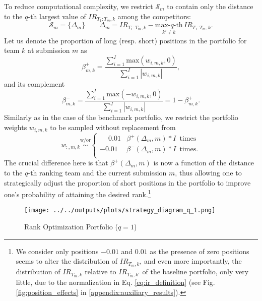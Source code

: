 \documentclass[3p,times,twocolumn]{elsarticle}
\begin{document}
To reduce computational complexity, we restrict $\mathcal{S}_{m}$ to contain only the distance to the $q$-th largest value of $IR_{T_{1}:T_{m},k}$ among the competitors:
\begin{equation}
    \mathcal{S}_m = \lbrace \Delta_{m} \rbrace \qquad \Delta_{m} = IR_{T_1:T_m,k} - \underset{k' \neq k}{\textrm{max-$q$-th}} \,IR_{T_1:T_m,k}.
\end{equation}
Let us denote the proportion of long (resp. short) positions in the portfolio for team $k$ at submission $m$ as
\begin{equation}
    \beta^{+}_{m,k} = \dfrac{\sum_{i=1}^{I}\textrm{max}(w_{i,m,k},0)}{\sum_{i=1}^{I}|w_{i,m,k}|},
\end{equation}
and its complement
\begin{equation}
    \beta^{-}_{m,k} = \dfrac{\sum_{i=1}^{I}\textrm{max}(-w_{i,m,k},0)}{\sum_{i=1}^{I}|w_{i,m,k}|} = 1- \beta^{+}_{m,k}.
\end{equation}
Similarly as in the case of the benchmark portfolio, we restrict the portfolio weights $w_{i,m,k}$ to be sampled without replacement from
\begin{equation}\label{eq:rank_opt_portfolio}
    w_{:,m,k} \overset{\mathrm{w/or}}{\sim} \begin{cases}
        \phantom{+}0.01 & \beta^{+}(\Delta_{m},m)*I\, \text{ times} \\
        -0.01  & \beta^{-}(\Delta_{m},m)*I\, \text{ times}. \\
    \end{cases}
\end{equation}
The crucial difference here is that $\beta^{+}(\Delta_{m},m)$ is now a function of the distance to the $q$-th ranking team and the current submission $m$, thus allowing one to strategically adjust the proportion of short positions in the portfolio to improve one's probability of attaining the desired rank.\footnote{
    We consider only positions $-0.01$ and $0.01$ as the presence of zero positions seems to alter the distribution of $IR_{T_{m},k}$, and even more importantly, the distribution of $IR_{T_{m},k}$ relative to $IR_{T_{m},k'}$ of the baseline portfolio, only very little, due to the normalization in Eq. \ref{eq:ir_definition} (see Fig. \ref{fig:position_effects} in \ref{appendix:auxiliary_results}).
}

\begin{figure}
    \centering
    \texttt{[image: ../../outputs/plots/strategy\_diagram\_q\_1.png]}
    \caption{Rank Optimization Portfolio ($q=1$)\\
        \footnotesize
    }
    \label{fig:strategy_diagram_q_1}
\end{figure}
\end{document}
